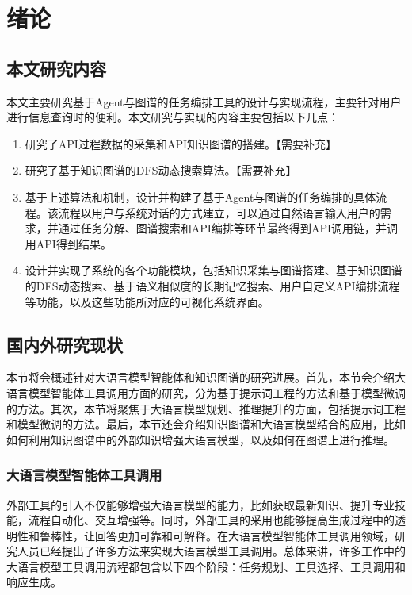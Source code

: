 
\chapter{绪论}

\section{本文研究内容}
本文主要研究基于Agent与图谱的任务编排工具的设计与实现流程，主要针对用户进行信息查询时的便利。本文研究与实现的内容主要包括以下几点：

\begin{enumerate}
    \item 研究了API过程数据的采集和API知识图谱的搭建。【需要补充】
    \item 研究了基于知识图谱的DFS动态搜索算法。【需要补充】
    \item 基于上述算法和机制，设计并构建了基于Agent与图谱的任务编排的具体流程。该流程以用户与系统对话的方式建立，可以通过自然语言输入用户的需求，并通过任务分解、图谱搜索和API编排等环节最终得到API调用链，并调用API得到结果。
    \item 设计并实现了系统的各个功能模块，包括知识采集与图谱搭建、基于知识图谱的DFS动态搜索、基于语义相似度的长期记忆搜索、用户自定义API编排流程等功能，以及这些功能所对应的可视化系统界面。
\end{enumerate}

\section{国内外研究现状}
本节将会概述针对大语言模型智能体和知识图谱的研究进展。首先，本节会介绍大语言模型智能体工具调用方面的研究，分为基于提示词工程的方法和基于模型微调的方法。其次，本节将聚焦于大语言模型规划、推理提升的方面，包括提示词工程和模型微调的方法。最后，本节还会介绍知识图谱和大语言模型结合的应用，比如如何利用知识图谱中的外部知识增强大语言模型，以及如何在图谱上进行推理。

\subsection{大语言模型智能体工具调用}
外部工具的引入不仅能够增强大语言模型的能力，比如获取最新知识、提升专业技能，流程自动化、交互增强等。同时，外部工具的采用也能够提高生成过程中的透明性和鲁棒性，让回答更加可靠和可解释。在大语言模型智能体工具调用领域，研究人员已经提出了许多方法来实现大语言模型工具调用。总体来讲，许多工作中的大语言模型工具调用流程都包含以下四个阶段：任务规划、工具选择、工具调用和响应生成\cite{Qin2023,Shen2023,Ruan2023}。

